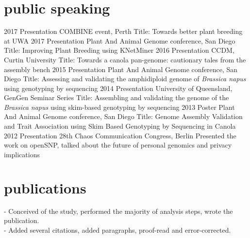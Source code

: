 \documentclass[]{friggeri-cv} %
\begin{document}
\section{public speaking}
\begin{entrylist}
\entry
{2017}
{Presentation}
{COMBINE event, Perth}
{Title: Towards better plant breeding at UWA}
\entry
{2017}
{Presentation}
{Plant And Animal Genome conference, San Diego}
{Title: Improving Plant Breeding using KNetMiner}
\entry
{2016}
{Presentation}
{CCDM, Curtin University}
{Title: Towards a canola pan-genome: cautionary tales from the assembly bench}
\entry
{2015}
{Presentation}
{Plant And Animal Genome conference, San Diego}
{Title: Assessing and validating the amphidiploid genome of \textit{Brassica napus} using genotyping by sequencing}
\entry
{2014}
{Presentation}
{University of Queensland, GenGen Seminar Series}
{Title: Assembling and validating the genome of the \textit{Brassica napus} using skim-based genotyping by sequencing}
\entry
{2013}
{Poster}
{Plant And Animal Genome conference, San Diego}
{Title: Genome Assembly Validation and Trait Association using Skim Based Genotyping by Sequencing in Canola}
\entry
{2012}
{Presentation}
{28th Chaos Communication Congress, Berlin}
{Presented the work on openSNP, talked about the future of personal genomics and privacy implications}
\end{entrylist}


\section{publications}

\cite{bayer2017assembly}
- Conceived of the study, performed the majority of analysis steps, wrote the publication.\\

\cite{yuan2017improvements}
- Added several citations, added paragraphs, proof-read and error-corrected.\\
\end{document}
